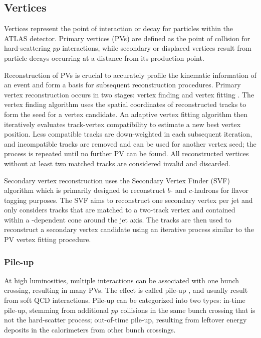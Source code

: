 \documentclass[../thesis.tex]{subfiles}
\begin{document}
\subsection{Vertices}
\label{sec:vertex}
Vertices represent the point of interaction or decay for particles within the ATLAS detector. Primary vertices (\acs{PV}s) are defined as the point of collision for hard-scattering $pp$ interactions, while secondary or displaced vertices result from particle decays occurring at a distance from its production point. 

Reconstruction of \acs{PV}s is crucial to accurately profile the kinematic information of an event and form a basis for subsequent reconstruction procedures. Primary vertex reconstruction occurs in two stages: vertex finding and vertex fitting \citep{reco:vertex_primary}. The vertex finding algorithm uses the spatial coordinates of reconstructed tracks to form the seed for a vertex candidate. An adaptive vertex fitting algorithm \citep{reco:vertex_fitting} then iteratively evaluates track-vertex compatibility to estimate a new best vertex position. Less compatible tracks are down-weighted in each subsequent iteration, and incompatible tracks are removed and can be used for another vertex seed; the process is repeated until no further \acs{PV} can be found. All reconstructed vertices without at least two matched tracks are considered invalid and discarded.

Secondary vertex reconstruction uses the Secondary Vertex Finder (SVF) algorithm \citep{reco:vertex_secondary} which is primarily designed to reconstruct $b$- and $c$-hadrons for flavor tagging purposes. The SVF aims to reconstruct one secondary vertex per jet and only considers tracks that are matched to a two-track vertex and contained within a \pT-dependent cone around the jet axis. The tracks are then used to reconstruct a secondary vertex candidate using an iterative process similar to the \acs{PV} vertex fitting procedure.

\subsubsection*{Pile-up}
At high luminosities, multiple interactions can be associated with one bunch crossing, resulting in many \acs{PV}s. The effect is called pile-up \citep{reco:pileup}, and usually result from soft \acs{QCD} interactions. Pile-up can be categorized into two types: in-time pile-up, stemming from additional $pp$ collisions in the same bunch crossing that is not the hard-scatter process; out-of-time pile-up, resulting from leftover energy deposits in the calorimeters from other bunch crossings.
\end{document}
